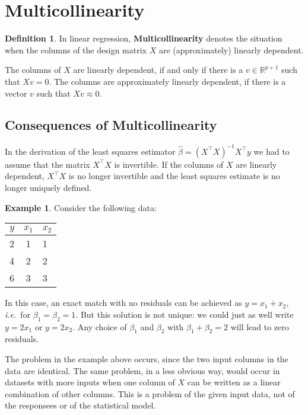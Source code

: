 \documentclass[
  a4paper,
]{article}
\theoremstyle{definition}
\newtheorem{definition}{Definition}[section]
\theoremstyle{definition}
\newtheorem{example}{Example}[section]
\theoremstyle{definition}
\theoremstyle{definition}
\theoremstyle{remark}
\begin{document}
\clearpage

\hypertarget{S10-multicoll}{%
\section{Multicollinearity}\label{S10-multicoll}}

\begin{definition}
In linear regression, \textbf{Multicollinearity} denotes the situation
when the columns of the design matrix \(X\) are (approximately) linearly
dependent.
\end{definition}

The columns of \(X\) are linearly dependent, if and only if
there is a \(v \in \mathbb{R}^{p+1}\) such that \(X v = 0\). The columns
are approximately linearly dependent, if there is a vector \(v\)
such that \(X v \approx 0\).

\hypertarget{consequences-of-multicollinearity}{%
\subsection{Consequences of Multicollinearity}\label{consequences-of-multicollinearity}}

In the derivation of the least squares estimator \(\hat\beta = (X^\top X)^{-1} X^\top y\) we had to assume that the matrix \(X^\top X\) is
invertible. If the columns of \(X\) are linearly dependent, \(X^\top X\) is no
longer invertible and the least squares estimate is no longer uniquely
defined.

\begin{example}
Consider the following data:

\begin{longtable}[]{@{}rcl@{}}
\toprule
\(y\) & \(x_1\) & \(x_2\) \\
\midrule
\endhead
2 & 1 & 1 \\
4 & 2 & 2 \\
6 & 3 & 3 \\
\bottomrule
\end{longtable}

In this case, an exact match with no residuals can be achieved
as \(y = x_1 + x_2\), \emph{i.e.}~for \(\beta_1 = \beta_2 = 1\). But this solution
is not unique: we could just as well write \(y = 2 x_1\) or \(y = 2 x_2\).
Any choice of \(\beta_1\) and \(\beta_2\) with \(\beta_1 + \beta_2 = 2\) will
lead to zero residuals.
\end{example}

The problem in the example above occurs, since the two input columns in the
data are identical. The same problem, in a less obvious way, would occur in
datasets with more inputs when one column of \(X\) can be written as a linear
combination of other columns. This is a problem of the given
input data, not of the responsees or of the statistical model.
\end{document}
